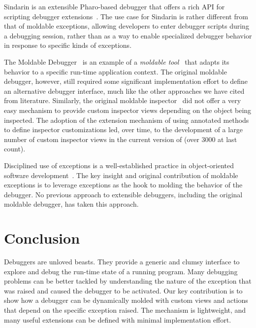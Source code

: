 \documentclass[sigplan,anonymous,review,10pt]{acmart}
\newcommand\on[1]{\nbc{ON}{#1}{olive}} %
\newcommand\ac[1]{\nbc{AC}{#1}{teal}}
\newcommand{\GT}{\lst{GT}\xspace} %
\begin{document}
Sindarin is an extensible Pharo-based debugger that offers a rich API for scripting debugger extensions~\cite{Dupr19a}.
The use case for Sindarin is rather different from that of moldable exceptions, allowing developers to enter debugger scripts during a debugging session, rather than as a way to enable specialized debugger behavior in response to specific kinds of exceptions.

The Moldable Debugger~\cite{Chis15c} is an example of a \emph{moldable tool}~\cite{Chis17a} that adapts its behavior to a specific run-time application context.
The original moldable debugger, however, still required some significant implementation effort to define an alternative debugger interface, much like the other approaches we have cited from literature.
Similarly, the original moldable inspector~\cite{Chis15a} did not offer a very easy mechanism to provide custom inspector views depending on the object being inspected.
The adoption of the extension mechanism of using annotated methods to define inspector customizations led, over time, to the development of a large number of custom inspector views in the current version of \GT (over 3000 at last count).

Disciplined use of exceptions is a well-established practice in object-oriented software development~\cite{Meye88a}.
The key insight and original contribution of moldable exceptions is to leverage exceptions as the hook to molding the behavior of the debugger.
No previous approach to extensible debuggers, including the original moldable debugger, has taken this approach.


\section{Conclusion}\label{sec:conclusion}

Debuggers are unloved beasts.
They provide a generic and clumsy interface to explore and debug the run-time state of a running program.
Many debugging problems can be better tackled by understanding the nature of the exception that was raised and caused the debugger to be activated.
Our key contribution is to show how a debugger can be dynamically molded with custom views and actions that depend on the specific exception raised.
The mechanism is lightweight, and many useful extensions can be defined with minimal implementation effort.
\end{document}
